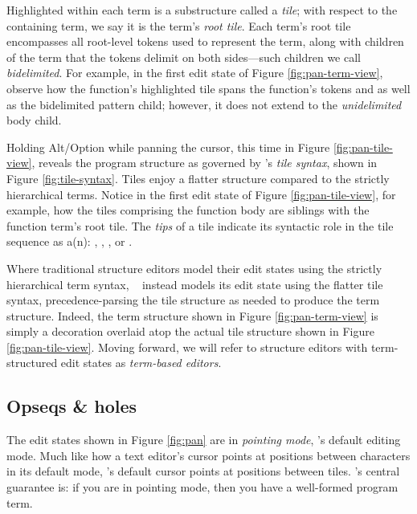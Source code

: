 Highlighted within each term is a substructure called a \emph{tile};
with respect to the containing term, we say it is the term's \emph{root tile}.
Each term's root tile encompasses all root-level tokens used to
represent the term, along with children of the term that the tokens
delimit on both sides---such children we call \emph{bidelimited}.
For example, in the first edit state of
Figure \ref{fig:pan-term-view}, observe how the function's highlighted
tile spans the function's tokens \code{$\boldsymbol{\lambda}$}
and 
as well as the bidelimited pattern child; however, it does not
extend to the \emph{unidelimited} body child.

Holding Alt/Option while panning the cursor, this time in
Figure \ref{fig:pan-tile-view}, reveals the program structure
as governed by \tylr's \emph{tile syntax},
shown in Figure \ref{fig:tile-syntax}.
Tiles enjoy a flatter structure compared to the
strictly hierarchical terms.
Notice in the first edit state of Figure \ref{fig:pan-tile-view},
for example, how the tiles comprising the function body
are siblings with the function term's root tile.
The \emph{tips} of a tile indicate its syntactic
role in the tile sequence as a(n):
, ,
, or .

Where traditional structure editors model their edit states
using the strictly hierarchical term syntax,
\tylr~ instead models its edit state using the flatter
tile syntax, precedence-parsing the tile structure
as needed to produce the term structure.
Indeed, the term structure shown in Figure \ref{fig:pan-term-view}
is simply a decoration overlaid atop the actual tile
structure shown in Figure \ref{fig:pan-tile-view}.
Moving forward, we will refer to structure editors
with term-structured edit states as \emph{term-based editors}.

\subsection{Opseqs \& holes}

The edit states shown in Figure \ref{fig:pan} are in
\emph{pointing mode}, \tylr's default editing mode.
Much like how a text editor's cursor points at positions
between characters in its default mode, \tylr's default
cursor points at positions between tiles.
\tylr's central guarantee is: if you are in pointing mode,
then you have a well-formed program term.

